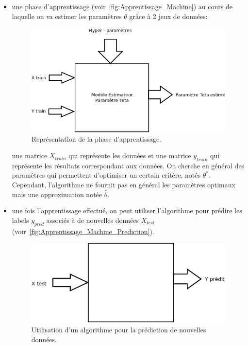 \begin{itemize}
 \item une phase d'apprentissage (voir~\autoref{fig:Apprentissage_Machine}) au cours de laquelle on va estimer les paramètres $\theta$ grâce à 2 jeux de données:
 
  	\begin{figure}[h]
  		\centering
  		\includegraphics[scale = 0.25]{images/Diagramme1}
  		\caption{Représentation de la phase d'apprentissage.}
  		\label{fig:Apprentissage_Machine}
  	\end{figure}
  	
 une matrice $X_{train}$ qui représente les données et une matrice $y_{train}$ qui représente les résultats correspondant aux données.
 On cherche en général des paramètres qui permettent d'optimiser un certain critère, notés $\theta^{*}$.
 Cependant, l'algorithme ne fournit pas en général les paramètres optimaux mais une approximation notée $\hat{\theta}$.
 
 \item une fois l'apprentissage effectué, on peut utiliser l'algorithme pour prédire les labels $y_{pred}$ associés à de nouvelles données $X_{test}$ (voir~\autoref{fig:Apprentissage_Machine_Prediction}).
 
 	\begin{figure}[h]
 		\centering
 		\includegraphics[scale = 0.25]{images/App_Mach_Prediction}
 		\caption{Utilisation d'un algorithme pour la prédiction de nouvelles données.}
 		\label{fig:Apprentissage_Machine_Prediction}
	 \end{figure}
\end{itemize}

